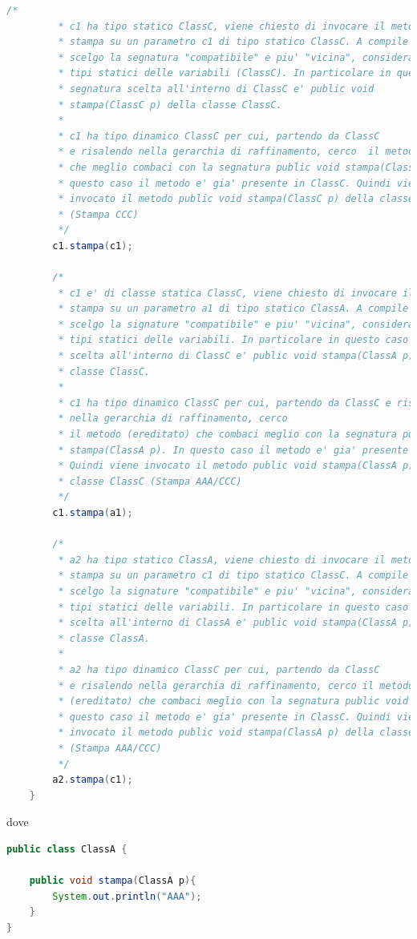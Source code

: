 \documentclass{article}
\begin{document}
\begin{lstlisting}[language=Java,escapechar=|]
		/*
		 * c1 ha tipo statico ClassC, viene chiesto di invocare il metodo 
		 * stampa su un parametro c1 di tipo statico ClassC. A compile time
		 * scelgo la segnatura "compatibile" e piu' "vicina", considerando i 
		 * tipi statici delle variabili (ClassC). In particolare in questo caso la 
		 * segnatura scelta all'interno di ClassC e' public void 
		 * stampa(ClassC p) della classe ClassC.
		 * 
		 * c1 ha tipo dinamico ClassC per cui, partendo da ClassC 
		 * e risalendo nella gerarchia di raffinamento, cerco  il metodo (ereditato)
		 * che meglio combaci con la segnatura public void stampa(ClassC p). In
		 * questo caso il metodo e' gia' presente in ClassC. Quindi viene
		 * invocato il metodo public void stampa(ClassC p) della classe ClassC
		 * (Stampa CCC)
		 */
		c1.stampa(c1);
		
		/*
		 * c1 e' di classe statica ClassC, viene chiesto di invocare il metodo 
		 * stampa su un parametro a1 di tipo statico ClassA. A compile time 
		 * scelgo la signature "compatibile" e piu' "vicina", considerando i 
		 * tipi statici delle variabili. In particolare in questo caso la signature 
		 * scelta all'interno di ClassC e' public void stampa(ClassA p) della 
		 * classe ClassC.
		 * 
		 * c1 ha tipo dinamico ClassC per cui, partendo da ClassC e risalendo
		 * nella gerarchia di raffinamento, cerco
		 * il metodo (ereditato) che combaci meglio con la segnatura public void 
		 * stampa(ClassA p). In questo caso il metodo e' gia' presente in ClassC. 
		 * Quindi viene invocato il metodo public void stampa(ClassA p) della 
		 * classe ClassC (Stampa AAA/CCC)
		 */
		c1.stampa(a1);

		/*
		 * a2 ha tipo statico ClassA, viene chiesto di invocare il metodo 
		 * stampa su un parametro c1 di tipo statico ClassC. A compile time
		 * scelgo la signature "compatibile" e piu' "vicina", considerando i 
		 * tipi statici delle variabili. In particolare in questo caso la signature 
		 * scelta all'interno di ClassA e' public void stampa(ClassA p) della 
		 * classe ClassA.
		 * 
		 * a2 ha tipo dinamico ClassC per cui, partendo da ClassC 
		 * e risalendo nella gerarchia di raffinamento, cerco il metodo 
		 * (ereditato) che combaci meglio con la segnatura public void stampa(ClassA p). In
		 * questo caso il metodo e' gia' presente in ClassC. Quindi viene
		 * invocato il metodo public void stampa(ClassA p) della classe ClassC
		 * (Stampa AAA/CCC)
		 */
		a2.stampa(c1);
	}
\end{lstlisting}
dove 
\begin{lstlisting}[language=Java,escapechar=|]
public class ClassA {

	public void stampa(ClassA p){
		System.out.println("AAA");
	}
}
\end{lstlisting}
\end{document}

